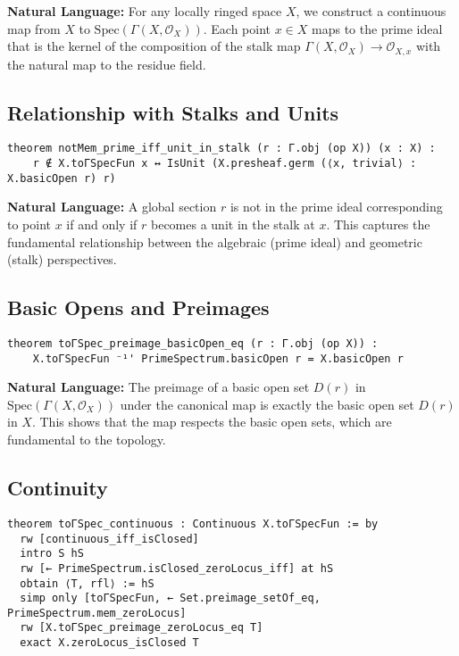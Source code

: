 \documentclass{article}
\theoremstyle{definition}
\begin{document}
\textbf{Natural Language:} For any locally ringed space $X$, we construct a continuous map from $X$ to $\mathrm{Spec}(\Gamma(X, \mathcal{O}_X))$. Each point $x \in X$ maps to the prime ideal that is the kernel of the composition of the stalk map $\Gamma(X, \mathcal{O}_X) \to \mathcal{O}_{X,x}$ with the natural map to the residue field.

\subsection{Relationship with Stalks and Units}

\begin{lstlisting}
theorem notMem_prime_iff_unit_in_stalk (r : Γ.obj (op X)) (x : X) :
    r ∉ X.toΓSpecFun x ↔ IsUnit (X.presheaf.germ (⟨x, trivial⟩ : X.basicOpen r) r)
\end{lstlisting}

\textbf{Natural Language:} A global section $r$ is not in the prime ideal corresponding to point $x$ if and only if $r$ becomes a unit in the stalk at $x$. This captures the fundamental relationship between the algebraic (prime ideal) and geometric (stalk) perspectives.

\subsection{Basic Opens and Preimages}

\begin{lstlisting}
theorem toΓSpec_preimage_basicOpen_eq (r : Γ.obj (op X)) :
    X.toΓSpecFun ⁻¹' PrimeSpectrum.basicOpen r = X.basicOpen r
\end{lstlisting}

\textbf{Natural Language:} The preimage of a basic open set $D(r)$ in $\mathrm{Spec}(\Gamma(X, \mathcal{O}_X))$ under the canonical map is exactly the basic open set $D(r)$ in $X$. This shows that the map respects the basic open sets, which are fundamental to the topology.

\subsection{Continuity}

\begin{lstlisting}
theorem toΓSpec_continuous : Continuous X.toΓSpecFun := by
  rw [continuous_iff_isClosed]
  intro S hS
  rw [← PrimeSpectrum.isClosed_zeroLocus_iff] at hS
  obtain ⟨T, rfl⟩ := hS
  simp only [toΓSpecFun, ← Set.preimage_setOf_eq, PrimeSpectrum.mem_zeroLocus]
  rw [X.toΓSpec_preimage_zeroLocus_eq T]
  exact X.zeroLocus_isClosed T
\end{lstlisting}
\end{document}
